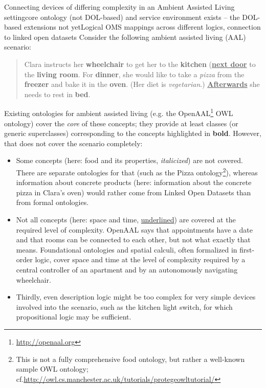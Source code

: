 \documentclass[10pt,%
\ifpretendfinal
final%
\else
draft%
\fi,
]{scrreprt}
\makeatletter
\newcommand*{\cf}{cf.\@\xspace}
\newcommand*{\eg}{e.g.\@\xspace}
\makeatother
\begin{document}
\begin{usecase}{Connecting devices of differing complexity in an Ambient Assisted Living setting}{core ontology (not DOL-based) and service environment exists – the DOL-based extensions not yet}{Logical OMS mappings across different logics, connection to linked open datasets}
  Consider the following ambient assisted living (AAL) scenario:
  \begin{quote}
    Clara instructs her \textbf{wheelchair} to get her to the \textbf{kitchen} (\textbf{\underline{next door}} to the \textbf{living room}.  For \textbf{dinner}, she would like to take a \textit{pizza} from the \textbf{freezer} and bake it in the \textbf{oven}.  (Her diet is \textit{vegetarian}.)  \textbf{\underline{Afterwards}} she needs to rest in \textbf{bed}.
  \end{quote}
  Existing ontologies for ambient assisted living (\eg the OpenAAL\footnote{\url{http://openaal.org}} OWL ontology) cover the \emph{core} of these  concepts; they provide at least classes (or generic superclasses) corresponding to the concepts highlighted in \textbf{bold}.  However, that does not cover the scenario completely:
  \begin{itemize}
  \item Some concepts (here: food and its properties, \textit{italicized}) are not covered.  There are separate ontologies for that (such as the Pizza ontology\footnote{This is not a fully comprehensive food ontology, but rather a well-known sample OWL ontology; \cf \url{http://owl.cs.manchester.ac.uk/tutorials/protegeowltutorial/}}), whereas information about concrete products (here: information about the concrete pizza in Clara's oven) would rather come from Linked Open Datasets than from formal ontologies.
  \item Not all concepts (here: space and time, \underline{underlined}) are covered at the required level of complexity.  OpenAAL says that appointments have a date and that rooms can be connected to each other, but not what exactly that means.  Foundational ontologies and spatial calculi, often formalized in first-order logic, cover space and time at the level of complexity required by a central controller of an apartment and by an autonomously navigating wheelchair.
  \item Thirdly, even description logic might be too complex for very simple devices involved into the scenario, such as the kitchen light switch, for which propositional logic may be sufficient.
  \end{itemize}

\end{usecase}
\end{document}
